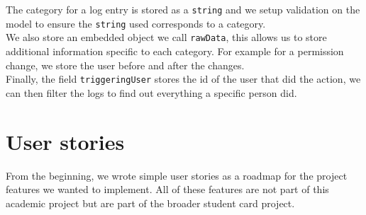 \documentclass[11pt,a4paper]{report}
\begin{document}
The category for a log entry is stored as a \verb+string+ and we setup validation on the model to ensure the \verb+string+ used corresponds to a category.\\

We also store an embedded object we call \verb+rawData+, this allows us to store additional information specific to each category. For example for a permission change, we store the user before and after the changes. \\

Finally, the field \verb+triggeringUser+ stores the id of the user that did the action, we can then filter the logs to find out everything a specific person did.
\section{User stories}
From the beginning, we wrote simple user stories as a roadmap for the project features we wanted to implement. All of these features are not part of this academic project but are part of the broader student card project. 
\end{document}
